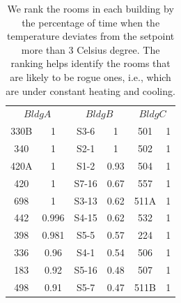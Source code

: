 \begin{table}[h!]
 \begin{center}
	\begin{tabular}{|c|c|c|c|c|c|}
	\multicolumn{2}{c}{$Bldg A$}
	 & \multicolumn{2}{c}{$Bldg B$}
	  & \multicolumn{2}{c}{$Bldg C$} \\
	\cline{1-6} 
	 330B & 1 & S3-6 & 1 & 501 & 1\\
	\cline{1-6}
	 340 & 1 & S2-1 & 1 & 502 & 1\\
	\cline{1-6}
	420A & 1 & S1-2 & 0.93 & 504 & 1\\
	\cline{1-6}
	420 & 1 & S7-16 & 0.67 & 557 & 1\\
	\cline{1-6}
	698 & 1 & S3-13 & 0.62 & 511A & 1\\
	\cline{1-6}
	442 & 0.996 & S4-15 & 0.62 & 532 & 1\\
	\cline{1-6}
	398 & 0.981 & S5-5 & 0.57 & 224 & 1\\
	\cline{1-6}
	336 & 0.96 & S4-1 & 0.54 & 506 & 1\\
	\cline{1-6}
	183 & 0.92 & S5-16 & 0.48 & 507 & 1\\
	\cline{1-6}
	498 & 0.91 & S5-7 & 0.47 & 511B & 1\\
	\cline{1-6}

	\end{tabular}
 \end{center}
 \caption{We rank the rooms in each building by the percentage of time when the temperature deviates from the setpoint more than 3 Celsius degree. The ranking helps identify the rooms that are likely to be rogue ones, i.e., which are under constant heating and cooling.}
 \label{tab:cluster}
\end{table}